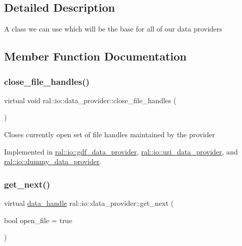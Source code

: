 \subsection{Detailed Description}
A class we can use which will be the base for all of our data providers 

\subsection{Member Function Documentation}
\mbox{\label{classral_1_1io_1_1data__provider_afa6216bccde854b011ed098e114ba8b3}} 
\subsubsection{\texorpdfstring{close\+\_\+file\+\_\+handles()}{close\_file\_handles()}}
{\footnotesize\ttfamily virtual void ral\+::io\+::data\+\_\+provider\+::close\+\_\+file\+\_\+handles (\begin{DoxyParamCaption}{ }\end{DoxyParamCaption})\hspace{0.3cm}{\ttfamily [pure virtual]}}

Closes currently open set of file handles maintained by the provider 

Implemented in \hyperlink{classral_1_1io_1_1gdf__data__provider_a4a78cce759b9bee4d09ceee3014644d2}{ral\+::io\+::gdf\+\_\+data\+\_\+provider}, \hyperlink{classral_1_1io_1_1uri__data__provider_afb66fcd6bc0ac46a75d195f160f9ec45}{ral\+::io\+::uri\+\_\+data\+\_\+provider}, and \hyperlink{classral_1_1io_1_1dummy__data__provider_a045c1295dc520dccc4db4cf753824e96}{ral\+::io\+::dummy\+\_\+data\+\_\+provider}.

\mbox{\label{classral_1_1io_1_1data__provider_aa49cde8c92f3bc4e9fcbe2e8f34e7ba3}} 
\subsubsection{\texorpdfstring{get\+\_\+next()}{get\_next()}}
{\footnotesize\ttfamily virtual \hyperlink{structral_1_1io_1_1data__handle}{data\+\_\+handle} ral\+::io\+::data\+\_\+provider\+::get\+\_\+next (\begin{DoxyParamCaption}\item[{bool}]{open\+\_\+file = {\ttfamily true} }\end{DoxyParamCaption})\hspace{0.3cm}{\ttfamily [pure virtual]}}

